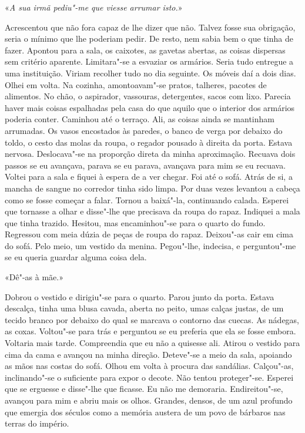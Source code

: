 «\emph{A sua irmã pediu"-me que viesse arrumar isto.}»

Acrescentou que não fora capaz de lhe dizer que não. Talvez fosse sua
obrigação, seria o mínimo que lhe poderiam pedir. De resto, nem sabia
bem o que tinha de fazer. Apontou para a sala, os caixotes, as gavetas
abertas, as coisas dispersas sem critério aparente. Limitara"-se a
esvaziar os armários. Seria tudo entregue a uma instituição. Viriam
recolher tudo no dia seguinte. Os móveis daí a dois dias. Olhei em
volta. Na cozinha, amontoavam"-se pratos, talheres, pacotes de
alimentos. No chão, o aspirador, vassouras, detergentes, sacos com lixo.
Parecia haver mais coisas espalhadas pela casa do que aquilo que o
interior dos armários poderia conter. Caminhou até o terraço. Ali, as
coisas ainda se mantinham arrumadas. Os vasos encostados às paredes, o
banco de verga por debaixo do toldo, o cesto das molas da roupa, o
regador pousado à direita da porta. Estava nervosa. Deslocava"-se na
proporção direta da minha aproximação. Recuava dois passos se eu
avançava, parava se eu parava, avançava para mim se eu recuava. Voltei
para a sala e fiquei à espera de a ver chegar. Foi até o sofá. Atrás de
si, a mancha de sangue no corredor tinha sido limpa. Por duas vezes
levantou a cabeça como se fosse começar a falar. Tornou a baixá"-la,
continuando calada. Esperei que tornasse a olhar e disse"-lhe que
precisava da roupa do rapaz. Indiquei a mala que tinha trazido. Hesitou,
mas encaminhou"-se para o quarto do fundo. Regressou com meia dúzia de
peças de roupa do rapaz. Deixou"-as cair em cima do sofá. Pelo meio, um
vestido da menina. Pegou"-lhe, indecisa, e perguntou"-me se eu queria
guardar alguma coisa dela.

«Dê"-as à mãe.»

Dobrou o vestido e dirigiu"-se para o quarto. Parou junto da porta.
Estava descalça, tinha uma blusa cavada, aberta no peito, umas calças
justas, de um tecido branco por debaixo do qual se marcava o contorno
das cuecas. As nádegas, as coxas. Voltou"-se para trás e perguntou se eu
preferia que ela se fosse embora. Voltaria mais tarde. Compreendia que
eu não a quisesse ali. Atirou o vestido para cima da cama e avançou na
minha direção. Deteve"-se a meio da sala, apoiando as mãos nas costas
do sofá. Olhou em volta à procura das sandálias. Calçou"-as,
inclinando"-se o suficiente para expor o decote. Não tentou
proteger"-se. Esperei que se erguesse e disse"-lhe que ficasse. Eu não
me demoraria. Endireitou"-se, avançou para mim e abriu mais os olhos.
Grandes, densos, de um azul profundo que emergia dos séculos como a
memória austera de um povo de bárbaros nas terras do império.

